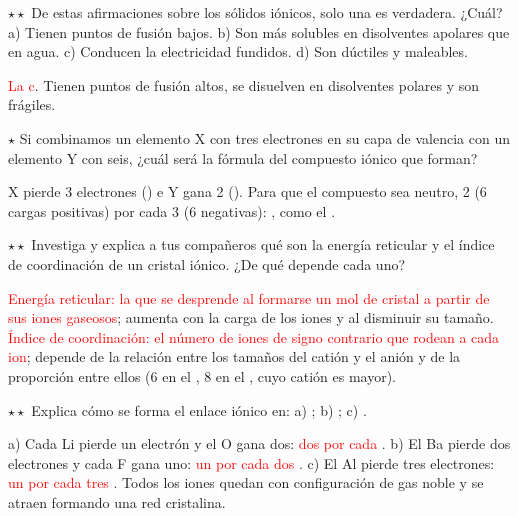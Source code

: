 \begin{exercise}
    \(\star\star\) De estas afirmaciones sobre los sólidos iónicos, solo una es verdadera. ¿Cuál? a) Tienen puntos de fusión bajos.
    b) Son más solubles en disolventes apolares que en agua. c) Conducen la electricidad fundidos. d) Son dúctiles y maleables.
    \begin{solu}
        \textcolor{red}{La c}. Tienen puntos de fusión altos, se disuelven en disolventes polares y son frágiles.
    \end{solu}
\end{exercise}

\begin{exercise}
    \(\star\) Si combinamos un elemento X con tres electrones en su capa de valencia con un elemento Y con seis, ¿cuál será la
    fórmula del compuesto iónico que forman?
    \begin{solu}
        X pierde 3 electrones () e Y gana 2 (). Para que el compuesto sea neutro, 2  (6 cargas
        positivas) por cada 3  (6 negativas): \textcolor{red}{}, como el .
    \end{solu}
\end{exercise}

\begin{exercise}
    \(\star\star\) Investiga y explica a tus compañeros qué son la energía reticular y el índice de coordinación de un cristal
    iónico. ¿De qué depende cada uno?
    \begin{solu}
        \textcolor{red}{Energía reticular: la que se desprende al formarse un mol de cristal a partir de sus iones gaseosos}; aumenta
        con la carga de los iones y al disminuir su tamaño. \textcolor{red}{Índice de coordinación: el número de iones de signo
        contrario que rodean a cada ion}; depende de la relación entre los tamaños del catión y el anión y de la proporción entre
        ellos (6 en el , 8 en el , cuyo catión es mayor).
    \end{solu}
\end{exercise}

\begin{exercise}
    \(\star\star\) Explica cómo se forma el enlace iónico en: a) ; b) ; c) .
    \begin{solu}
        a) Cada Li pierde un electrón y el O gana dos: \textcolor{red}{dos  por cada }. b) El Ba pierde dos
        electrones y cada F gana uno: \textcolor{red}{un  por cada dos }. c) El Al pierde tres electrones:
        \textcolor{red}{un  por cada tres }. Todos los iones quedan con configuración de gas noble y se atraen
        formando una red cristalina.
    \end{solu}
\end{exercise}

